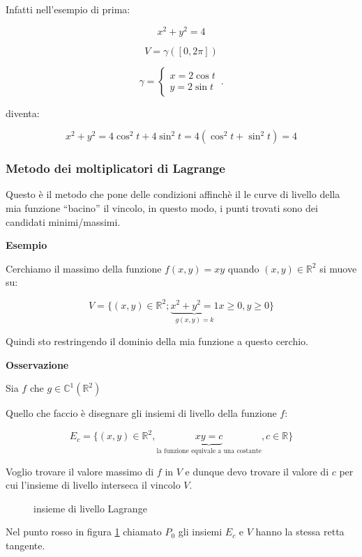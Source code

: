 \documentclass[../appunti-analisi.tex]{subfiles}
\begin{document}
Infatti nell'esempio di prima:

\[
    x^{2}+y^{2} = 4
\]

\[
    V = \gamma([0,2\pi])
\]

\[
    \gamma =
        \begin{cases}
            x=2 \cos t\\
               y= 2 \sin t
        \end{cases}\,.
\]

diventa:

\[
    x^{2}+y^{2} = 4 \cos ^{2} t + 4 \sin ^{2} t = 4 ( \cos ^{2} t + \sin ^{2} t) =4
\]

\subsubsection{Metodo dei moltiplicatori di Lagrange}

Questo è il metodo che pone delle condizioni affinchè il le curve di livello della mia funzione ``bacino'' il vincolo, in questo modo, i punti trovati sono dei candidati minimi/massimi.

\textbf{Esempio} 

Cerchiamo il massimo della funzione $f(x,y) = xy$ quando $(x,y) \in \mathbb{R}^{2}$ si muove su:

\[
    V= \{(x,y) \in \mathbb{R}^{2};\underbrace{ x^{2}+y^{2}=1}_\text{$g(x,y) = k$} x \ge 0, y \ge 0\}
\]

Quindi sto restringendo il dominio della mia funzione a questo cerchio.

\textbf{Osservazione} 

Sia $f$ che $g \in \mathbb{C}^{1}(\mathbb{R}^{2})$

Quello che faccio è disegnare gli insiemi di livello della funzione $f$:

\[
    E_c = \{(x,y) \in \mathbb{R}^{2}, \underbrace{xy = c}_\text{la funzione equivale a una costante}, c \in \mathbb{R}\}
\]

Voglio trovare il valore massimo di $f$ in $V$ e dunque devo trovare il valore di $c$ per cui l'insieme di livello interseca il vincolo $V$.


\begin{figure}[ht]
    \caption{insieme di livello Lagrange}
    \label{fig:insieme-di-livello-lagrange}
\end{figure}

Nel punto rosso in figura \ref{fig:insieme-di-livello-lagrange} chiamato $P_0$ gli insiemi $E_c$ e $V$ hanno la stessa retta tangente.
\end{document}
